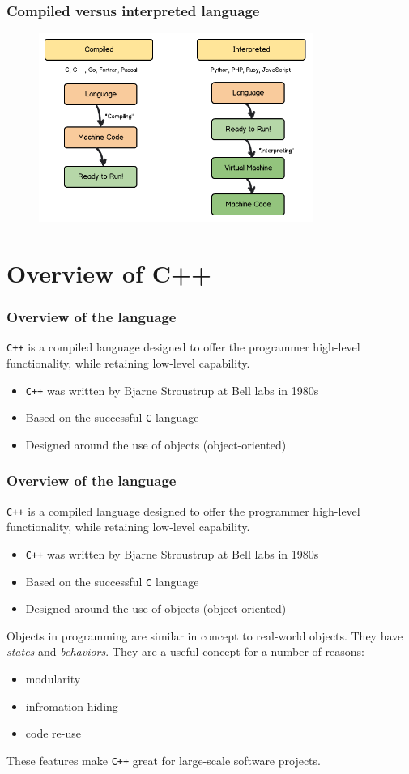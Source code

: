 \documentclass{if-beamer}
\begin{document}
\begin{frame}
\frametitle{Compiled versus interpreted language}
\begin{figure}
\center
\includegraphics[width=0.8\textwidth]{compiled_vs_interp.png}
\end{figure}
\end{frame}

\section{Overview of C++}

\begin{frame}
\frametitle{Overview of the language}
\texttt{C++} is a compiled language designed to offer the programmer
high-level functionality, while retaining low-level capability.
\begin{itemize}
\item \texttt{C++} was written by Bjarne Stroustrup at Bell labs in 1980s
\item Based on the successful \texttt{C} language
\item Designed around the use of objects (object-oriented)
\end{itemize}
\end{frame}

\begin{frame}
\frametitle{Overview of the language}
\texttt{C++} is a compiled language designed to offer the programmer
high-level functionality, while retaining low-level capability.
\begin{itemize}
	\item \texttt{C++} was written by Bjarne Stroustrup at Bell labs in 1980s
	\item Based on the successful \texttt{C} language
	\item Designed around the use of objects (object-oriented)
\end{itemize}
	Objects in programming are similar in concept to real-world objects.
	They have \textit{states} and \textit{behaviors}. They are a useful
	concept for a number of reasons:
	\begin{itemize}
		\item modularity
		\item infromation-hiding
		\item code re-use
	\end{itemize}
	These features make \texttt{C++} great for large-scale software projects.
\end{frame}
\end{document}
